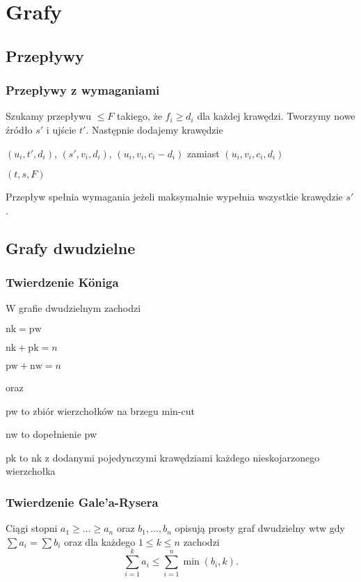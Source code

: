 \section{Grafy}

\subsection{Przepływy}

\subsubsection{Przepływy z wymaganiami}
Szukamy przepływu $\leq F$ takiego, że $f_i \geq d_i$ dla każdej krawędzi.
Tworzymy nowe źródło $s'$ i ujście $t'$.
Następnie dodajemy krawędzie
\begin{compactitem}
  \item $(u_i, t', d_i)$, $(s', v_i, d_i)$, $(u_i, v_i, c_i - d_i)$ zamiast $(u_i, v_i, c_i, d_i)$ 
  \item $(t, s, F)$
\end{compactitem}
Przepływ spełnia wymagania jeżeli maksymalnie wypełnia wszystkie krawędzie $s'$.

\subsection{Grafy dwudzielne}

\subsubsection{Twierdzenie K\"oniga}
W grafie dwudzielnym zachodzi
\begin{compactitem}
  \item $\mathrm{nk} = \mathrm{pw}$
  \item $\mathrm{nk} + \mathrm{pk} = n$
  \item $\mathrm{pw} + \mathrm{nw} = n$
\end{compactitem}
oraz
\begin{compactitem}
  \item pw to zbiór wierzchołków na brzegu min-cut
  \item nw to dopełnienie pw
  \item pk to nk z dodanymi pojedynczymi krawędziami każdego nieskojarzonego wierzchołka
\end{compactitem}

\subsubsection{Twierdzenie Gale'a-Rysera}
Ciągi stopni $a_1 \geq \dots \geq a_n$ oraz $b_1, \dots, b_n$ opisują
prosty graf dwudzielny wtw gdy $\sum a_i = \sum b_i$ oraz dla każdego $1 \leq k \leq n$ zachodzi
\[
  \sum_{i=1}^{k} a_i \leq \sum_{i=1}^{n} \min(b_i, k).
\]

